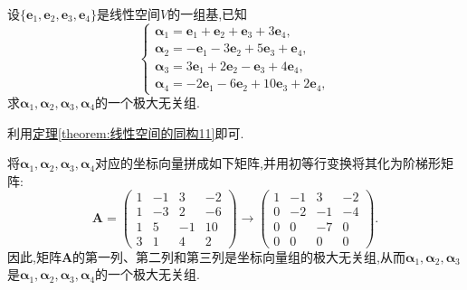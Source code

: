 \documentclass[../../main.tex]{subfiles}%
\begin{document}
\begin{example}
设\(\{\boldsymbol{e}_1,\boldsymbol{e}_2,\boldsymbol{e}_3,\boldsymbol{e}_4\}\)是线性空间\(V\)的一组基,已知
\[
\begin{cases}
\boldsymbol{\alpha}_1=\boldsymbol{e}_1+\boldsymbol{e}_2+\boldsymbol{e}_3 + 3\boldsymbol{e}_4,\\
\boldsymbol{\alpha}_2=-\boldsymbol{e}_1-3\boldsymbol{e}_2 + 5\boldsymbol{e}_3+\boldsymbol{e}_4,\\
\boldsymbol{\alpha}_3=3\boldsymbol{e}_1+2\boldsymbol{e}_2-\boldsymbol{e}_3 + 4\boldsymbol{e}_4,\\
\boldsymbol{\alpha}_4=-2\boldsymbol{e}_1-6\boldsymbol{e}_2 + 10\boldsymbol{e}_3+2\boldsymbol{e}_4,
\end{cases}
\]
求\(\boldsymbol{\alpha}_1,\boldsymbol{\alpha}_2,\boldsymbol{\alpha}_3,\boldsymbol{\alpha}_4\)的一个极大无关组.
\end{example}
\begin{note}
利用\hyperref[theorem:线性空间的同构11]{定理\ref{theorem:线性空间的同构11}}即可.
\end{note}
\begin{solution}

将\(\boldsymbol{\alpha}_1,\boldsymbol{\alpha}_2,\boldsymbol{\alpha}_3,\boldsymbol{\alpha}_4\)对应的坐标向量拼成如下矩阵,并用初等行变换将其化为阶梯形矩阵:
\[
\boldsymbol{A}=\begin{pmatrix}
1&-1&3&-2\\
1&-3&2&-6\\
1&5&-1&10\\
3&1&4&2
\end{pmatrix}\to\begin{pmatrix}
1&-1&3&-2\\
0&-2&-1&-4\\
0&0&-7&0\\
0&0&0&0
\end{pmatrix}.
\]
因此,矩阵\(\boldsymbol{A}\)的第一列、第二列和第三列是坐标向量组的极大无关组,从而\(\boldsymbol{\alpha}_1,\boldsymbol{\alpha}_2,\boldsymbol{\alpha}_3\)是\(\boldsymbol{\alpha}_1,\boldsymbol{\alpha}_2,\boldsymbol{\alpha}_3,\boldsymbol{\alpha}_4\)的一个极大无关组. 

\end{solution}
\end{document}
